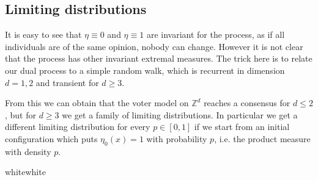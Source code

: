 \documentclass[12pt,a2paper,landscape]{article}
\newcommand\cBOX[4]{\begin{center}\fcolorbox{#4}{#3}{%
 \begin{minipage}{#1\columnwidth}#2\end{minipage}}\end{center}\vfill}
\begin{document}
\begin{multicols*}{3}
{{\subsection*{Limiting distributions}
It is easy to see that $\eta \equiv 0$ and $ \eta \equiv 1$ are invariant for the process, as if all
individuals are of the same opinion, nobody can change. However it is not clear that the 
process has other invariant extremal measures.
The trick here is to relate our dual process to a simple random walk, 
which is recurrent in dimension $d=1,2$ and transient for $d \geq 3$. 
\vspace{1ex}

From this we can obtain that the voter model on $\mathbb{Z}^{d}$
reaches a consensus for $d \leq 2$, but for $d \geq 3$ we get a family of limiting distributions. In particular
we get a different limiting distribution for every $p \in [0,1]$ if we start from an initial configuration 
which puts $\eta_{0}(x)=1$ with probability $p$, i.e. the product measure with density $p$.
}{white}{white}






\vspace{-2cm}
}
\end{multicols*}
\end{document}
